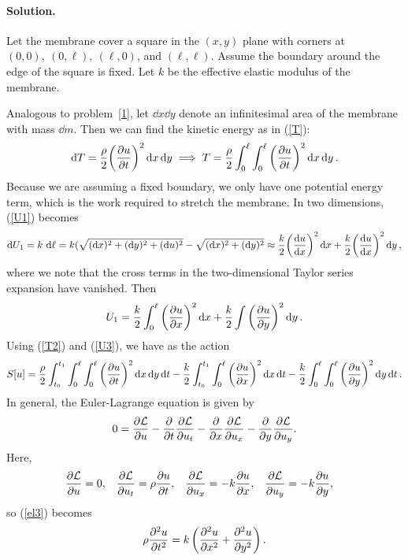 \documentclass[11pt]{article}
\newcommand{\refeq}[1]{(\ref{#1})}
\newenvironment{solution}
{
    \paragraph{Solution.}
    \ignorespaces
}
{
}
\begin{document}
\begin{solution}
	Let the membrane cover a square in the $(x, y)$ plane with corners at $(0, 0),\ (0, \ell),\ (\ell, 0)$, and $(\ell, \ell)$.  Assume the boundary around the edge of the square is fixed.  Let $k$ be the effective elastic modulus of the membrane.
	
	Analogous to problem~\ref{1}, let $\dd{x} \dd{y}$ denote an infinitesimal area of the membrane with mass $\dd{m}$.  Then we can find the kinetic energy as in \refeq{T}:
	\begin{equation} \label{T2}
		\dd{T} = \frac{\rho}{2} \bigg( \pdv{u}{t} \bigg)^2 \dd{x} \dd{y} \implies T = \frac{\rho}{2} \int_0^\ell \int_0^\ell \bigg( \pdv{u}{t} \bigg)^2 \dd{x} \dd{y}.
	\end{equation}
	Because we are assuming a fixed boundary, we only have one potential energy term, which is the work required to stretch the membrane.  In two dimensions, \refeq{U1} becomes
	\begin{equation}
		\dd{U_1} = k \,\dd{\ell} = k (\sqrt{(\dd{x})^2 + (\dd{y})^2 + (\dd{u})^2} - \sqrt{(\dd{x})^2 + (\dd{y})^2} \approx \frac{k}{2} \bigg( \dv{u}{x} \bigg)^2 \dd{x} + \frac{k}{2} \bigg( \dv{u}{x} \bigg)^2 \dd{y},
	\end{equation}
	where we note that the cross terms in the two-dimensional Taylor series expansion have vanished.  Then
	\begin{equation} \label{U3}
		U_1 = \frac{k}{2} \int_0^\ell \bigg( \pdv{u}{x} \bigg)^2 \dd{x} + \frac{k}{2} \int \bigg( \pdv{u}{y} \bigg)^2 \dd{y}.
	\end{equation}
	Using \refeq{T2} and \refeq{U3}, we have as the action
	\begin{equation}
		S[u] = \frac{\rho}{2} \int_{t_0}^{t_1} \int_0^\ell \int_0^\ell \bigg( \pdv{u}{t} \bigg)^2 \dd{x} \dd{y} \dd{t} - \frac{k}{2} \int_{t_0}^{t_1} \int_0^\ell \bigg( \pdv{u}{x} \bigg)^2 \dd{x} \dd{t} - \frac{k}{2} \int_0^\ell \int_0^\ell \bigg( \pdv{u}{y} \bigg)^2 \dd{y} \dd{t}.
	\end{equation}
	In general, the Euler-Lagrange equation is given by
	\begin{equation} \label{el3}
		0 = \pdv{\mathcal{L}}{u} - \pdv{t} \pdv{\mathcal{L}}{u_t} - \pdv{x} \pdv{\mathcal{L}}{u_x} - \pdv{y} \pdv{\mathcal{L}}{u_y}.
	\end{equation}
	Here,
	\begin{align}
		\pdv{\mathcal{L}}{u} &= 0, &
		\pdv{\mathcal{L}}{u_t} &= \rho \pdv{u}{t}, &
		\pdv{\mathcal{L}}{u_x} &= -k \pdv{u}{x}, &
		\pdv{\mathcal{L}}{u_y} &= -k \pdv{u}{y},
	\end{align}
	so \refeq{el3} becomes
	\begin{equation}
		\rho \pdv[2]{u}{t} = k \left( \pdv[2]{u}{x} + \pdv[2]{u}{y} \right).
	\end{equation}
\end{solution}
\end{document}
